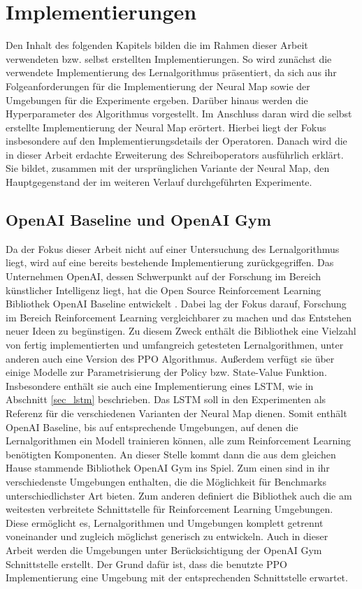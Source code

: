 \chapter{Implementierungen}
\label{chap_impl}

Den Inhalt des folgenden Kapitels bilden die im Rahmen dieser Arbeit verwendeten bzw. selbst erstellten Implementierungen. So wird zunächst die verwendete Implementierung des Lernalgorithmus präsentiert, da sich aus ihr Folgeanforderungen für die Implementierung der Neural Map sowie der Umgebungen für die Experimente ergeben. Darüber hinaus werden die Hyperparameter des Algorithmus vorgestellt. Im Anschluss daran wird die selbst erstellte Implementierung der Neural Map erörtert. Hierbei liegt der Fokus insbesondere auf den Implementierungsdetails der Operatoren. Danach wird die in dieser Arbeit erdachte Erweiterung des Schreiboperators ausführlich erklärt. Sie bildet, zusammen mit der ursprünglichen Variante der Neural Map, den Hauptgegenstand der im weiteren Verlauf durchgeführten Experimente.


\section{OpenAI Baseline und OpenAI Gym}
\label{ppo_impl}

Da der Fokus dieser Arbeit nicht auf einer Untersuchung des Lernalgorithmus liegt, wird auf eine bereits bestehende Implementierung zurückgegriffen. Das Unternehmen OpenAI, dessen Schwerpunkt auf der Forschung im Bereich künstlicher Intelligenz liegt, hat die Open Source Reinforcement Learning Bibliothek OpenAI Baseline entwickelt \cite{Baselines}. Dabei lag der Fokus darauf, Forschung im Bereich Reinforcement Learning vergleichbarer zu machen und das Entstehen neuer Ideen zu begünstigen. Zu diesem Zweck enthält die Bibliothek eine Vielzahl von fertig implementierten und umfangreich getesteten Lernalgorithmen, unter anderen auch eine Version des PPO Algorithmus. Außerdem verfügt sie über einige Modelle zur Parametrisierung der Policy bzw. State-Value Funktion. Insbesondere enthält sie auch eine Implementierung eines LSTM, wie in Abschnitt \ref{sec_lstm} beschrieben. Das LSTM soll in den Experimenten als Referenz für die verschiedenen Varianten der Neural Map dienen. Somit enthält OpenAI Baseline, bis auf entsprechende Umgebungen, auf denen die Lernalgorithmen ein Modell trainieren können, alle zum Reinforcement Learning benötigten Komponenten. An dieser Stelle kommt dann die aus dem gleichen Hause stammende Bibliothek OpenAI Gym ins Spiel. Zum einen sind in ihr verschiedenste Umgebungen enthalten, die die Möglichkeit für Benchmarks unterschiedlichster Art bieten. Zum anderen definiert die Bibliothek auch die am weitesten verbreitete Schnittstelle für Reinforcement Learning Umgebungen. Diese ermöglicht es, Lernalgorithmen und Umgebungen komplett getrennt voneinander und zugleich möglichst generisch zu entwickeln. Auch in dieser Arbeit werden die Umgebungen unter Berücksichtigung der OpenAI Gym Schnittstelle erstellt. Der Grund dafür ist, dass die benutzte PPO Implementierung eine Umgebung mit der entsprechenden Schnittstelle erwartet.

